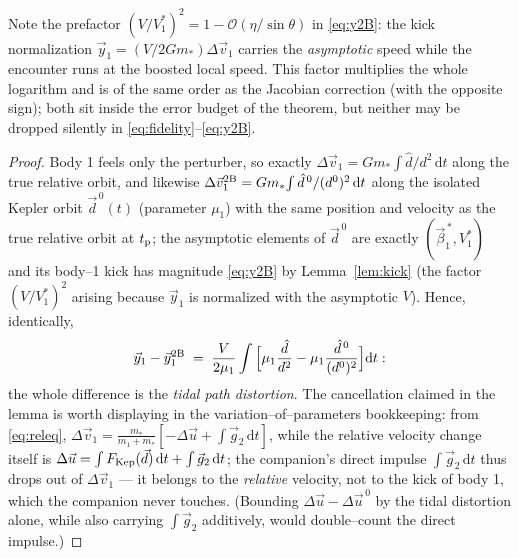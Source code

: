 \documentclass[11pt]{article}
\newcommand{\dd}{\mathrm{d}}
\newcommand{\order}[1]{\mathcal O\!\left(#1\right)}
\begin{document}
Note the prefactor $(V/V_1^*)^2=1-\order{\eta/\sin\theta}$ in \eqref{eq:y2B}: the kick normalization
$\vec y_1=(V/2Gm_*)\Delta\vec v_1$ carries the \emph{asymptotic} speed while the encounter runs at
the boosted local speed. This factor multiplies the whole logarithm and is of the same order as the
Jacobian correction (with the opposite sign); both sit inside the error budget of the theorem, but
neither may be dropped silently in \eqref{eq:fidelity}--\eqref{eq:y2B}.

\begin{proof}
Body 1 feels only the perturber, so exactly
$\Delta\vec v_1=Gm_*\!\int\hat d/d^2\,\dd t$ along the true relative orbit, and likewise
$\Delta\vec v_1^{\rm 2B}=Gm_*\!\int\hat d^{\,0}/(d^0)^2\,\dd t$ along the isolated Kepler orbit
$\vec d^{\,0}(t)$ (parameter $\mu_1$) with the same position and velocity as the true relative
orbit at $t_{\rm p}$; the asymptotic elements of $\vec d^{\,0}$ are exactly
$(\vec\beta_1^{\,*},V_1^*)$ and its body--1 kick has magnitude \eqref{eq:y2B} by
Lemma~\ref{lem:kick} (the factor $(V/V_1^*)^2$ arising because $\vec y_1$ is normalized with the
asymptotic $V$). Hence, identically,
\begin{equation}
  \vec y_1-\vec y_1^{\rm 2B}
  \;=\;\frac{V}{2\mu_1}\int\Big[\mu_1\frac{\hat d}{d^{2}}-\mu_1\frac{\hat d^{\,0}}{(d^{0})^{2}}
  \Big]\dd t :
  \label{eq:exact-diff}
\end{equation}
the whole difference is the \emph{tidal path distortion}. The cancellation claimed in the lemma is
worth displaying in the variation--of--parameters bookkeeping: from \eqref{eq:releq},
$\Delta\vec v_1=\frac{m_*}{m_1+m_*}[-\Delta\vec u+\int\vec g_2\,\dd t]$, while the relative
velocity change itself is $\Delta\vec u=\int F_{\rm Kep}(\vec d)\,\dd t+\int\vec g_2\,\dd t$; the
companion's direct impulse $\int\vec g_2\,\dd t$ thus drops out of $\Delta\vec v_1$ --- it belongs
to the \emph{relative} velocity, not to the kick of body 1, which the companion never touches.
(Bounding $\Delta\vec u-\Delta\vec u^{\,0}$ by the tidal distortion alone, while also carrying
$\int\vec g_2$ additively, would double--count the direct impulse.)


\end{proof}
\end{document}
